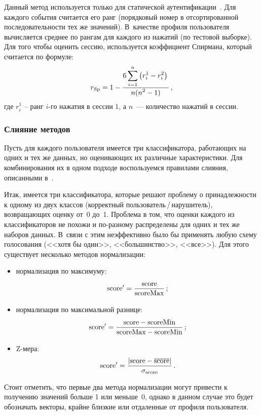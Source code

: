 \begin{multicols}{2}
Данный метод используется только для статической аутентификации~\cite{bergadano}. 
Для каждого события считается его ранг (порядковый
номер в отсортированной последовательности тех же значений). 
В~качестве профиля пользователя вычисляется среднее по рангам для
каждого из нажатий (по тестовой выборке). Для того чтобы оценить
сессию, используется коэффициент Спирмана, который считается по
формуле:
$$r_{\mathrm{Sp}} = 1 - \displaystyle\frac{\displaystyle 6 \sum\limits_{i=1}^n\left(r_i^1 - r_i^2\right)\mathstrut}{\displaystyle n  (n^2 -1)\mathstrut}\,,
$$
где $r_i^1$ -- ранг $i$-го нажатия в сессии $1$, а $n$~--- количество нажатий в сессии.

\subsubsection{Слияние методов}
Пусть для каждого пользователя имеется три классификатора,
работающих на одних и тех же данных, но оценивающих их различные
характеристики. Для комбинирования их в одном подходе воспользуемся
правилами слияния, описанными в~\cite{kittler}.

Итак, имеется три классификатора, которые решают проблему о
принадлежности к одному из двух классов (корректный
пользователь\,/\,на\-ру\-ши\-тель), возвращающих оценку от~0 до~1. Проблема в
том, что оценки каждого из классификаторов не похожи и по-раз\-но\-му
распределены для одних и тех же наборов данных. В~связи с этим
неэффективно было бы применять любую схему голосования (<<хотя бы
один>>, <<большинство>>, <<все>>). Для этого существует несколько
методов нормализации:
\begin{itemize}
    \item нормализация по максимуму: 
    $$\mathrm{score}'=\displaystyle\frac{\displaystyle \mathrm{score}\mathstrut}{\displaystyle \mathrm{scoreMax}\mathstrut}\,;
    $$
    \item нормализация по максимальной разнице: 
    $$
    \mathrm{score}' = \displaystyle\frac{\displaystyle \mathrm{score - scoreMin}\mathstrut}{\displaystyle \mathrm{scoreMax - scoreMin}\mathstrut}\,;
    $$
    \item Z-мера: 
    $$
    \mathrm{score}'=\displaystyle\frac{\displaystyle |\mathrm{score} - \overline{\mathrm{score}}|\mathstrut}{\displaystyle \sigma_{\mathrm{score}}\mathstrut}\,.
    $$
\end{itemize}

Стоит отметить, что первые два метода нормализации могут привести к
получению значений больше 1 или меньше~0, однако в данном случае это
будет обозначать векторы, крайне близкие или отдаленные от профиля
пользователя.


\end{multicols}
